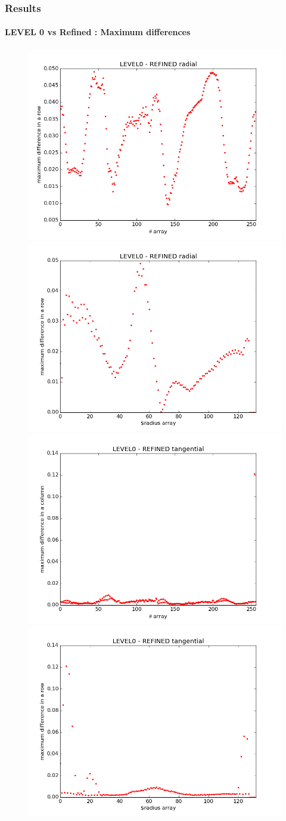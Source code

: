 \documentclass{beamer}
\begin{document}
\begin{frame}
\frametitle{Results}
\framesubtitle{LEVEL 0 vs Refined : Maximum differences}
\begin{figure}
\includegraphics[width = .5\textwidth]{./1D_diff_radial.png}
\includegraphics[width = .5\textwidth]{./1D_diff_radial_radius.png}
\newline
\includegraphics[width = .5\textwidth]{./1D_diff_tangential.png}
\includegraphics[width = .5\textwidth]{./1D_diff_tangential_radius.png}
\end{figure} 
\end{frame}
\end{document}
